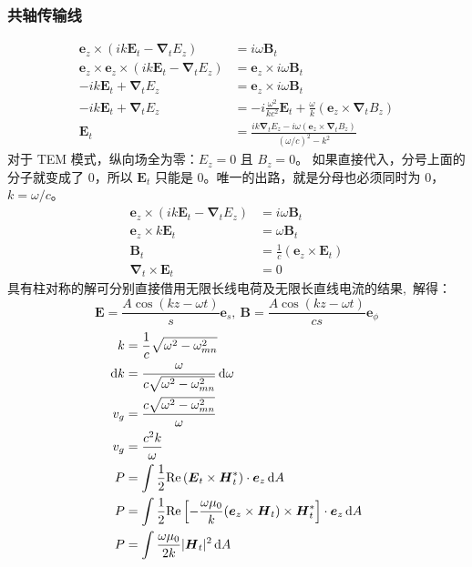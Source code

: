 \subsubsection{共轴传输线}
\begin{align}
    \boldsymbol{e}_z \times (i k \boldsymbol{E}_t - \boldsymbol\nabla_t E_z) &= i \omega \boldsymbol{B}_t\nonumber\\
    \boldsymbol{e}_z \times\boldsymbol{e}_z \times (i k \boldsymbol{E}_t - \boldsymbol\nabla_t E_z) &= \boldsymbol{e}_z \times i \omega \boldsymbol{B}_t\nonumber\\
    -i k \boldsymbol{E}_t + \boldsymbol\nabla_t E_z &= \boldsymbol{e}_z \times i \omega \boldsymbol{B}_t\nonumber\\
    -i k \boldsymbol{E}_t + \boldsymbol\nabla_t E_z &= -i \frac{\omega^2}{k c^2} \boldsymbol{E}_t + \frac{\omega}{k} (\boldsymbol{e}_z \times \boldsymbol\nabla_t B_z)\nonumber\\
    \boldsymbol{E}_t &= \frac{i k \boldsymbol\nabla_t E_z - i \omega (\boldsymbol{e}_z \times \boldsymbol\nabla_t B_z)}{(\omega/c)^2 - k^2}
\end{align}
对于 TEM 模式，纵向场全为零：$E_z = 0$ 且 $B_z = 0$。
如果直接代入，分号上面的分子就变成了 $0$，所以 $\boldsymbol{E}_t$ 只能是 $0$。唯一的出路，就是分母也必须同时为 $0$，$k=\omega/c$。
\begin{align*}
    \boldsymbol{e}_z \times (i k\boldsymbol{E}_t - \boldsymbol\nabla_t E_z) &= i \omega \boldsymbol{B}_t\\
    \boldsymbol{e}_z \times  k\boldsymbol{E}_t   &= \omega \boldsymbol{B}_t\\
    \boldsymbol{B}_t &= \frac{1}{c} (\boldsymbol{e}_z \times \boldsymbol{E}_t)\\
    \boldsymbol\nabla_t \times \boldsymbol{E}_t& = 0
\end{align*}
具有柱对称的解可分别直接借用无限长线电荷及无限长直线电流的结果,\, 解得：
\begin{equation}
    \boldsymbol{E}=\frac{A\cos(kz-\omega t)}{s}\boldsymbol{e}_s,\ \boldsymbol{B}=\frac{A\cos(kz-\omega t)}{cs}\boldsymbol{e}_\phi
\end{equation}
\begin{align*}
    k&=\frac{1}{c}\sqrt{\omega^2-\omega_{mn}^2}\\
    \dif k&=\frac{\omega}{c\sqrt{\omega^2-\omega_{mn}^2}}\dif \omega\\
    v_g&=\frac{c\sqrt{\omega^2-\omega_{mn}^2}}{\omega}\\
    v_g&=\frac{c^2k}{\omega}\\
    P &= \int \frac{1}{2} \text{Re} \left( \boldsymbol{E}_t \times \boldsymbol{H}_t^* \right) \cdot \boldsymbol{e}_z\dif A\\
    P &= \int \frac{1}{2} \text{Re} \left[ -\frac{\omega\mu_0}{k} ({\boldsymbol{e}_z} \times \boldsymbol{H}_t) \times \boldsymbol{H}_t^* \right] \cdot \boldsymbol{e}_z\dif A\\
    P &= \int \frac{\omega\mu_0}{2k} |\boldsymbol{H}_t|^2 \dif A
    \end{align*}
